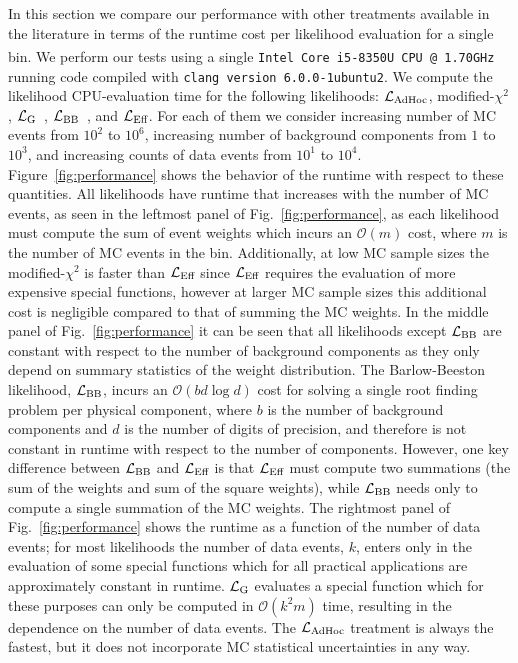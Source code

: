 In this section we compare our performance with other treatments available in the literature in terms of the runtime cost per likelihood evaluation for a single bin.
We perform our tests using a single \texttt{Intel\textsuperscript{\textregistered} Core\texttrademark{} i5-8350U CPU @ 1.70GHz} running code compiled with \texttt{clang version 6.0.0-1ubuntu2}.
We compute the likelihood CPU-evaluation time for the following likelihoods: $\mathcal{L}_{\textmd{AdHoc}}$, modified-$\chi^2$, $\mathcal{L}_\textmd{G}$~\cite{Glusenkamp:2017rlp}, $\mathcal{L}_{\textmd{BB}}$~\cite{Barlow:1993dm}, and $\mathcal{L}_\textmd{Eff}$.
For each of them we consider increasing number of MC events from $10^2$ to $10^6$, increasing number of background components from $1$ to $10^3$, and increasing counts of data events from $10^1$ to $10^4$.
Figure~\ref{fig:performance} shows the behavior of the runtime with respect to these quantities.
All likelihoods have runtime that increases with the number of MC events, as seen in the leftmost panel of Fig.~\ref{fig:performance}, as each likelihood must compute the sum of event weights which incurs an $\mathcal{O}(m)$ cost, where $m$ is the number of MC events in the bin.
Additionally, at low MC sample sizes the modified-$\chi^2$ is faster than $\mathcal{L}_\textmd{Eff}$ since $\mathcal{L}_\textmd{Eff}$ requires the evaluation of more expensive special functions, however at larger MC sample sizes this additional cost is negligible compared to that of summing the MC weights.
In the middle panel of Fig.~\ref{fig:performance} it can be seen that all likelihoods except $\mathcal{L}_{\textmd{BB}}$ are constant with respect to the number of background components as they only depend on summary statistics of the weight distribution.
The Barlow-Beeston likelihood, $\mathcal{L}_{\textmd{BB}}$, incurs an $\mathcal{O}(b d \log d)$ cost for solving a single root finding problem per physical component, where $b$ is the number of background components and $d$ is the number of digits of precision, and therefore is not constant in runtime with respect to the number of components.
However, one key difference between $\mathcal{L}_{\textmd{BB}}$ and $\mathcal{L}_\textmd{Eff}$ is that $\mathcal{L}_\textmd{Eff}$ must compute two summations (the sum of the weights and sum of the square weights), while $\mathcal{L}_{\textmd{BB}}$ needs only to compute a single summation of the MC weights.
The rightmost panel of Fig.~\ref{fig:performance} shows the runtime as a function of the number of data events; for most likelihoods the number of data events, $k$, enters only in the evaluation of some special functions which for all practical applications are approximately constant in runtime.
$\mathcal{L}_\textmd{G}$ evaluates a special function which for these purposes can only be computed in $\mathcal{O}(k^2 m)$ time, resulting in the dependence on the number of data events.
The $\mathcal{L}_{\textmd{AdHoc}}$ treatment is always the fastest, but it does not incorporate MC statistical uncertainties in any way.

